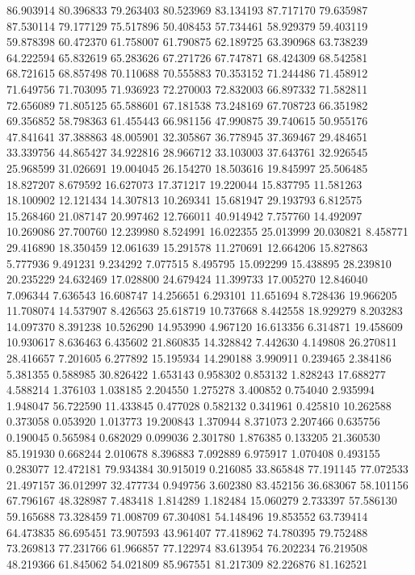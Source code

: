 86.903914
80.396833
79.263403
80.523969
83.134193
87.717170
79.635987
87.530114
79.177129
75.517896
50.408453
57.734461
58.929379
59.403119
59.878398
60.472370
61.758007
61.790875
62.189725
63.390968
63.738239
64.222594
65.832619
65.283626
67.271726
67.747871
68.424309
68.542581
68.721615
68.857498
70.110688
70.555883
70.353152
71.244486
71.458912
71.649756
71.703095
71.936923
72.270003
72.832003
66.897332
71.582811
72.656089
71.805125
65.588601
67.181538
73.248169
67.708723
66.351982
69.356852
58.798363
61.455443
66.981156
47.990875
39.740615
50.955176
47.841641
37.388863
48.005901
32.305867
36.778945
37.369467
29.484651
33.339756
44.865427
34.922816
28.966712
33.103003
37.643761
32.926545
25.968599
31.026691
19.004045
26.154270
18.503616
19.845997
25.506485
18.827207
8.679592
16.627073
17.371217
19.220044
15.837795
11.581263
18.100902
12.121434
14.307813
10.269341
15.681947
29.193793
6.812575
15.268460
21.087147
20.997462
12.766011
40.914942
7.757760
14.492097
10.269086
27.700760
12.239980
8.524991
16.022355
25.013999
20.030821
8.458771
29.416890
18.350459
12.061639
15.291578
11.270691
12.664206
15.827863
5.777936
9.491231
9.234292
7.077515
8.495795
15.092299
15.438895
28.239810
20.235229
24.632469
17.028800
24.679424
11.399733
17.005270
12.846040
7.096344
7.636543
16.608747
14.256651
6.293101
11.651694
8.728436
19.966205
11.708074
14.537907
8.426563
25.618719
10.737668
8.442558
18.929279
8.203283
14.097370
8.391238
10.526290
14.953990
4.967120
16.613356
6.314871
19.458609
10.930617
8.636463
6.435602
21.860835
14.328842
7.442630
4.149808
26.270811
28.416657
7.201605
6.277892
15.195934
14.290188
3.990911
0.239465
2.384186
5.381355
0.588985
30.826422
1.653143
0.958302
0.853132
1.828243
17.688277
4.588214
1.376103
1.038185
2.204550
1.275278
3.400852
0.754040
2.935994
1.948047
56.722590
11.433845
0.477028
0.582132
0.341961
0.425810
10.262588
0.373058
0.053920
1.013773
19.200843
1.370944
8.371073
2.207466
0.635756
0.190045
0.565984
0.682029
0.099036
2.301780
1.876385
0.133205
21.360530
85.191930
0.668244
2.010678
8.396883
7.092889
6.975917
1.070408
0.493155
0.283077
12.472181
79.934384
30.915019
0.216085
33.865848
77.191145
77.072533
21.497157
36.012997
32.477734
0.949756
3.602380
83.452156
36.683067
58.101156
67.796167
48.328987
7.483418
1.814289
1.182484
15.060279
2.733397
57.586130
59.165688
73.328459
71.008709
67.304081
54.148496
19.853552
63.739414
64.473835
86.695451
73.907593
43.961407
77.418962
74.780395
79.752488
73.269813
77.231766
61.966857
77.122974
83.613954
76.202234
76.219508
48.219366
61.845062
54.021809
85.967551
81.217309
82.226876
81.162521
